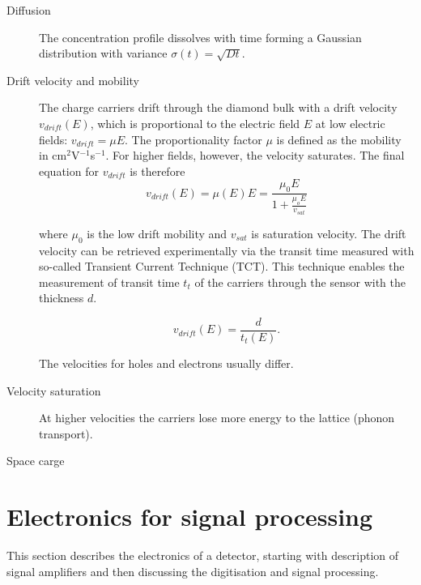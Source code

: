 \documentclass[12pt]{mytustyle}  %
\begin{document}
\begin{description}

\item[Diffusion]
The concentration profile dissolves with time forming a Gaussian distribution with variance $\sigma(t)=\sqrt{Dt}$. 

\item[Drift velocity and mobility]
The charge carriers drift through the diamond bulk with a drift velocity $v_{drift}(E)$, which is proportional to the electric field $E$ at low electric fields: $v_{drift} = \mu E$. The proportionality factor $\mu$ is defined as the mobility in cm$^2$V$^{-1}$s$^{-1}$. For higher fields, however, the velocity saturates. The final equation for $v_{drift}$ is therefore
\begin{equation}
\label{eq:vsat}
v_{drift}(E) = \mu(E)E= \frac{\mu_0 E}{1 + \frac{\mu_o E}{v_{sat}}}
\end{equation}

where $\mu_0$ is the low drift mobility and $v_{sat}$ is saturation velocity. The drift velocity can be retrieved experimentally via the transit time measured with so-called Transient Current Technique (TCT). This technique enables the measurement of transit time $t_t$ of the carriers through the sensor with the thickness $d$. 

\begin{equation}
\label{eq:vsat}
v_{drift}(E) = \frac{d}{t_t(E)}.
\end{equation}

The velocities for holes and electrons usually differ. 

\item[Velocity saturation]
At higher velocities the carriers lose more energy to the lattice (phonon transport).

\item[Space carge]


\end{description}













\clearpage
\section{Electronics for signal processing} %
\label{sec:elecsigproc}
This section describes the electronics of a detector, starting with description of signal amplifiers and then discussing the digitisation and signal processing.
\end{document}
